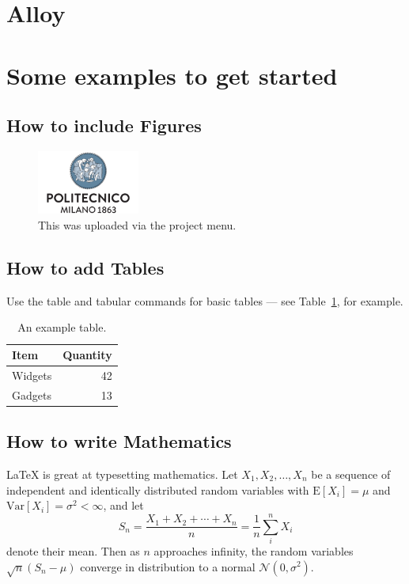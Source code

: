 \documentclass[a4paper]{article}
\begin{document}
\newpage
\section{Alloy}




\section{Some examples to get started}

\subsection{How to include Figures}

\begin{figure}[h]
\centering
\includegraphics[width=0.3\textwidth]{resources/polimi.png}
\caption{\label{fig:frog}This was uploaded via the project menu.}
\end{figure}

\subsection{How to add Tables}

Use the table and tabular commands for basic tables --- see Table~\ref{tab:widgets}, for example. 

\begin{table}[h]
\centering
\begin{tabular}{l|r}
Item & Quantity \\\hline
Widgets & 42 \\
Gadgets & 13
\end{tabular}
\caption{\label{tab:widgets}An example table.}
\end{table}

\subsection{How to write Mathematics}

\LaTeX{} is great at typesetting mathematics. Let $X_1, X_2, \ldots, X_n$ be a sequence of independent and identically distributed random variables with $\text{E}[X_i] = \mu$ and $\text{Var}[X_i] = \sigma^2 < \infty$, and let
\[S_n = \frac{X_1 + X_2 + \cdots + X_n}{n}
      = \frac{1}{n}\sum_{i}^{n} X_i\]
denote their mean. Then as $n$ approaches infinity, the random variables $\sqrt{n}(S_n - \mu)$ converge in distribution to a normal $\mathcal{N}(0, \sigma^2)$.
\end{document}
